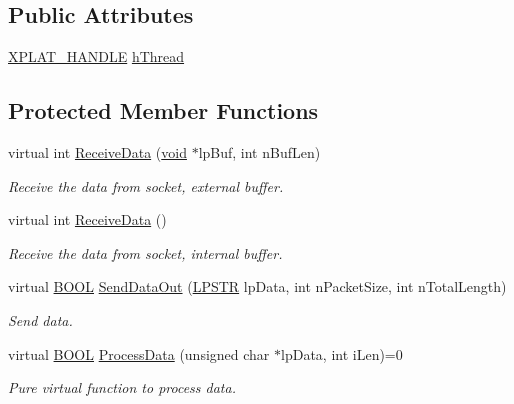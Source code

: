 \subsection*{\-Public \-Attributes}
\begin{DoxyCompactItemize}
\item 
\hyperlink{_x_plat_8h_af3c5c1485bb09f4be888d78cdaf93e00}{\-X\-P\-L\-A\-T\-\_\-\-H\-A\-N\-D\-L\-E} \hyperlink{class_c_connection_socket_af47f017bb0e097654d633fd32da63024}{h\-Thread}
\end{DoxyCompactItemize}
\subsection*{\-Protected \-Member \-Functions}
\begin{DoxyCompactItemize}
\item 
virtual int \hyperlink{class_c_connection_socket_a8ecacc72605561cc4caf0e4e5b1544d3}{\-Receive\-Data} (\hyperlink{_cpclient_8h_a6464f7480a0fd0ee170cba12b2c0497f}{void} $\ast$lp\-Buf, int n\-Buf\-Len)
\begin{DoxyCompactList}\small\item\em \-Receive the data from socket, external buffer. \end{DoxyCompactList}\item 
virtual int \hyperlink{class_c_connection_socket_ae51ffdd227d424b6c3ffdb6c6b79e336}{\-Receive\-Data} ()
\begin{DoxyCompactList}\small\item\em \-Receive the data from socket, internal buffer. \end{DoxyCompactList}\item 
virtual \hyperlink{_cpclient_8h_a3be13892ae7076009afcf121347dd319}{\-B\-O\-O\-L} \hyperlink{class_c_connection_socket_a54eab4ef6efbf0e23f12c45e4784895c}{\-Send\-Data\-Out} (\hyperlink{_x_plat_8h_ad162cb9da5f09788c88e33cd9486a158}{\-L\-P\-S\-T\-R} lp\-Data, int n\-Packet\-Size, int n\-Total\-Length)
\begin{DoxyCompactList}\small\item\em \-Send data. \end{DoxyCompactList}\item 
virtual \hyperlink{_cpclient_8h_a3be13892ae7076009afcf121347dd319}{\-B\-O\-O\-L} \hyperlink{class_c_connection_socket_a11c2aef1e11bbac03c72ec9444b8e85f}{\-Process\-Data} (unsigned char $\ast$lp\-Data, int i\-Len)=0
\begin{DoxyCompactList}\small\item\em \-Pure virtual function to process data. \end{DoxyCompactList}\item 

\end{DoxyCompactItemize}
